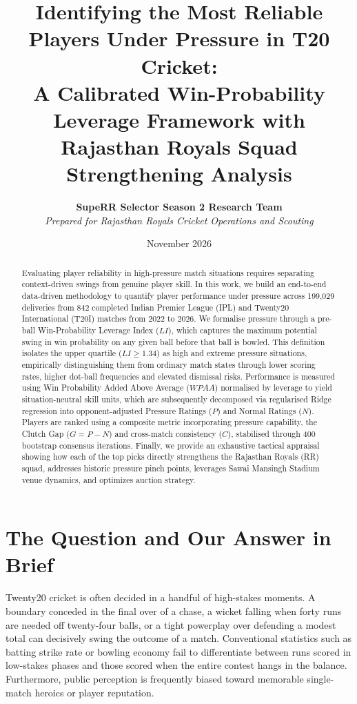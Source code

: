 \documentclass[11pt,a4paper]{article}
\title{\textbf{Identifying the Most Reliable Players Under Pressure in T20 Cricket:\\A Calibrated Win-Probability Leverage Framework with Rajasthan Royals Squad Strengthening Analysis}}
\author{\textbf{SupeRR Selector Season 2 Research Team}\\\textit{Prepared for Rajasthan Royals Cricket Operations and Scouting}}
\date{November 2026}
\begin{document}
\maketitle

\begin{abstract}
Evaluating player reliability in high-pressure match situations requires separating context-driven swings from genuine player skill. In this work, we build an end-to-end data-driven methodology to quantify player performance under pressure across 199,029 deliveries from 842 completed Indian Premier League (IPL) and Twenty20 International (T20I) matches from 2022 to 2026. We formalise pressure through a pre-ball Win-Probability Leverage Index ($LI$), which captures the maximum potential swing in win probability on any given ball before that ball is bowled. This definition isolates the upper quartile ($LI \ge 1.34$) as high and extreme pressure situations, empirically distinguishing them from ordinary match states through lower scoring rates, higher dot-ball frequencies and elevated dismissal risks. Performance is measured using Win Probability Added Above Average ($WPAA$) normalised by leverage to yield situation-neutral skill units, which are subsequently decomposed via regularised Ridge regression into opponent-adjusted Pressure Ratings ($P$) and Normal Ratings ($N$). Players are ranked using a composite metric incorporating pressure capability, the Clutch Gap ($G = P - N$) and cross-match consistency ($C$), stabilised through 400 bootstrap consensus iterations. Finally, we provide an exhaustive tactical appraisal showing how each of the top picks directly strengthens the Rajasthan Royals (RR) squad, addresses historic pressure pinch points, leverages Sawai Mansingh Stadium venue dynamics, and optimizes auction strategy.
\end{abstract}

\section{The Question and Our Answer in Brief}
\label{sec:introduction}

Twenty20 cricket is often decided in a handful of high-stakes moments. A boundary conceded in the final over of a chase, a wicket falling when forty runs are needed off twenty-four balls, or a tight powerplay over defending a modest total can decisively swing the outcome of a match. Conventional statistics such as batting strike rate or bowling economy fail to differentiate between runs scored in low-stakes phases and those scored when the entire contest hangs in the balance. Furthermore, public perception is frequently biased toward memorable single-match heroics or player reputation.
\end{document}

